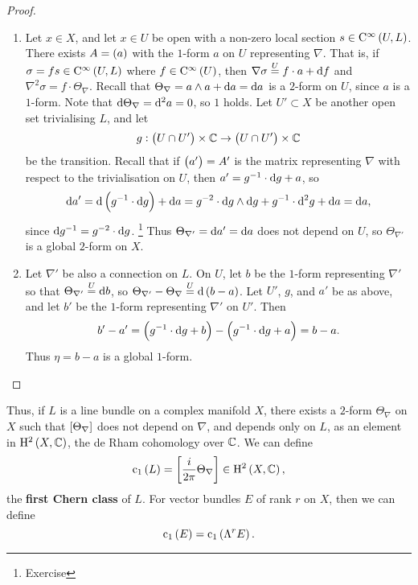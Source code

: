 \begin{proof}
\hfill
\begin{enumerate}
\item Let $ x \in X $, and let $ x \in U $ be open with a non-zero local section $ s \in \C^\infty\br{U, L} $. There exists $ A = \br{a} $ with the $ 1 $-form $ a $ on $ U $ representing $ \nabla $. That is, if $ \sigma = fs \in \C^\infty\br{U, L} $ where $ f \in \C^\infty\br{U} $, then $ \nabla\sigma \overset{U}{=} f \cdot a + \mathrm{d} f $ and $ \nabla^2\sigma = f \cdot \Theta_\nabla $. Recall that $ \Theta_\nabla = a \wedge a + \mathrm{d} a = \mathrm{d} a $ is a $ 2 $-form on $ U $, since $ a $ is a $ 1 $-form. Note that $ \mathrm{d}\Theta_\nabla = \mathrm{d}^2a = 0 $, so $ 1 $ holds. Let $ U' \subset X $ be another open set trivialising $ L $, and let
$$ g : \br{U \cap U'} \times \CC \to \br{U \cap U'} \times \CC $$
be the transition. Recall that if $ \br{a'} = A' $ is the matrix representing $ \nabla $ with respect to the trivialisation on $ U $, then $ a' = g^{-1} \cdot \mathrm{d} g + a $, so
$$ \d a' = \d\br{g^{-1} \cdot \d g} + \d a = g^{-2} \cdot \d g \wedge \d g + g^{-1} \cdot \d^2g + \d a = \d a, $$
since $ \mathrm{d} g^{-1} = g^{-2} \cdot \mathrm{d} g $. \footnote{Exercise} Thus $ \Theta_{\nabla'} = \mathrm{d} a' = \mathrm{d} a $ does not depend on $ U $, so $ \Theta_{\nabla'} $ is a global $ 2 $-form on $ X $.


\item Let $ \nabla' $ be also a connection on $ L $. On $ U $, let $ b $ be the $ 1 $-form representing $ \nabla' $ so that $ \Theta_{\nabla'} \overset{U}{=} \mathrm{d} b $, so $ \Theta_{\nabla'} - \Theta_\nabla \overset{U}{=} \d\br{b - a} $. Let $ U' $, $ g $, and $ a' $ be as above, and let $ b' $ be the $ 1 $-form representing $ \nabla' $ on $ U' $. Then
$$ b' - a' = \br{g^{-1} \cdot \d g + b} - \br{g^{-1} \cdot \d g + a} = b - a. $$
Thus $ \eta = b - a $ is a global $ 1 $-form.
\end{enumerate}
\end{proof}

\pagebreak

\begin{remark}
Thus, if $ L $ is a line bundle on a complex manifold $ X $, there exists a $ 2 $-form $ \Theta_\nabla $ on $ X $ such that $ \sbr{\Theta_\nabla} $ does not depend on $ \nabla $, and depends only on $ L $, as an element in $ \H^2\br{X, \CC} $, the de Rham cohomology over $ \mathbb{C} $. We can define
$$ \c_1\br{L} = \sbr{\dfrac{i}{2\pi}\Theta_\nabla} \in \H^2\br{X, \CC}, $$
the \textbf{first Chern class} of $ L $. For vector bundles $ E $ of rank $ r $ on $ X $, then we can define
$$ \c_1\br{E} = \c_1\br{\Lambda^rE}. $$
\end{remark}

